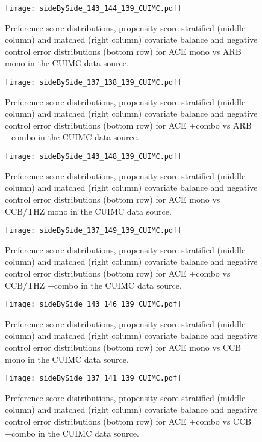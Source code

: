 \documentclass[11pt,]{article}
\begin{document}
\begin{figure}
    \caption{Preference score distributions,
    propensity score stratified (middle column) and matched (right column) covariate balance
    and negative control error distributions (bottom row) for
    ACE mono vs ARB mono in the CUIMC data source.}
    \centerline{
        \texttt{[image: sideBySide\_143\_144\_139\_CUIMC.pdf]}
    }
\end{figure}
\begin{figure}
    \caption{Preference score distributions,
    propensity score stratified (middle column) and matched (right column) covariate balance
    and negative control error distributions (bottom row) for
    ACE +combo vs ARB +combo in the CUIMC data source.}
    \centerline{
        \texttt{[image: sideBySide\_137\_138\_139\_CUIMC.pdf]}
    }
\end{figure}
\begin{figure}
    \caption{Preference score distributions,
    propensity score stratified (middle column) and matched (right column) covariate balance
    and negative control error distributions (bottom row) for
    ACE mono vs CCB/THZ mono in the CUIMC data source.}
    \centerline{
        \texttt{[image: sideBySide\_143\_148\_139\_CUIMC.pdf]}
    }
\end{figure}
\begin{figure}
    \caption{Preference score distributions,
    propensity score stratified (middle column) and matched (right column) covariate balance
    and negative control error distributions (bottom row) for
    ACE +combo vs CCB/THZ +combo in the CUIMC data source.}
    \centerline{
        \texttt{[image: sideBySide\_137\_149\_139\_CUIMC.pdf]}
    }
\end{figure}
\begin{figure}
    \caption{Preference score distributions,
    propensity score stratified (middle column) and matched (right column) covariate balance
    and negative control error distributions (bottom row) for
    ACE mono vs CCB mono in the CUIMC data source.}
    \centerline{
        \texttt{[image: sideBySide\_143\_146\_139\_CUIMC.pdf]}
    }
\end{figure}
\begin{figure}
    \caption{Preference score distributions,
    propensity score stratified (middle column) and matched (right column) covariate balance
    and negative control error distributions (bottom row) for
    ACE +combo vs CCB +combo in the CUIMC data source.}
    \centerline{
        \texttt{[image: sideBySide\_137\_141\_139\_CUIMC.pdf]}
    }
\end{figure}
\end{document}
